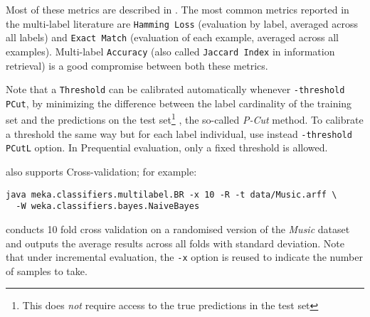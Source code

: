 \documentclass[11pt]{article}
\newcommand{\MEKA}{Meka}
\begin{document}
Most of these metrics are described in \cite{ECC2,MMD}. The most common metrics reported in the multi-label literature are \texttt{Hamming Loss} (evaluation by label, averaged across all labels) and \texttt{Exact Match} (evaluation of each example, averaged across all examples). Multi-label \texttt{Accuracy} (also called \texttt{Jaccard Index} in information retrieval) is a good compromise between both these metrics.


Note that a \texttt{Threshold} can be calibrated automatically whenever \texttt{-threshold PCut}, by minimizing the difference between the label cardinality of the training set and the predictions on the test set\footnote{This does \emph{not} require access to the true predictions in the test set} \cite{ECC2}, the so-called \textit{P-Cut} method. To calibrate a threshold the same way but for each label individual, use instead \texttt{-threshold PCutL} option. In \textsf{Prequential} evaluation, only a fixed threshold is allowed.


\framework{\MEKA} also supports \textsf{Cross-validation}; for example:
\begin{lstlisting}
java meka.classifiers.multilabel.BR -x 10 -R -t data/Music.arff \
  -W weka.classifiers.bayes.NaiveBayes
\end{lstlisting}
conducts 10 fold cross validation on a randomised version of the \textit{Music} dataset and outputs the average results across all folds with standard deviation. Note that under incremental evaluation, the \texttt{-x} option is reused to indicate the number of samples to take. %
\end{document}
